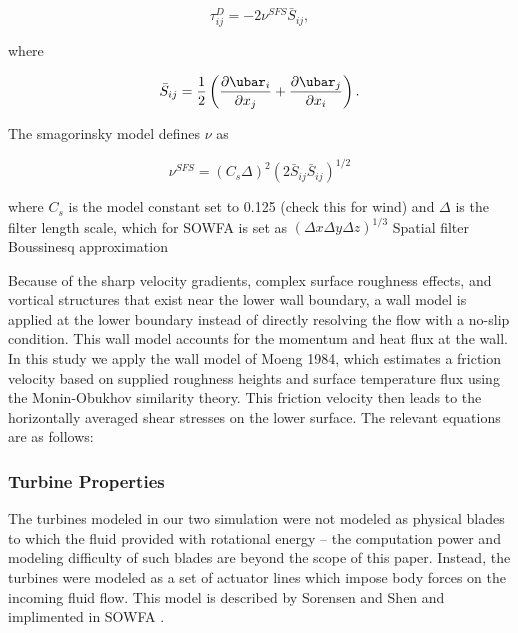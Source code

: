 \begin{equation}
   \label{eq:smagorinsky}
   \tau^D_{ij} = -2 \nu^{SFS} \bar{S}_{ij},
\end{equation}

where

\begin{equation}
   \bar{S}_{ij} = \frac{1}{2} \left( \frac{\partial \ubar_i}{\partial x_j} + \frac{\partial \ubar_j}{\partial x_i} \right).
\end{equation}

The smagorinsky model defines $\nu$ as

\begin{equation}
   \nu^{SFS} = (C_s \Delta)^2(2\bar{S}_{ij}\bar{S}_{ij})^{1/2}
\end{equation}

where $C_s$ is the model constant set to 0.125 (check this for wind) and $\Delta$ is the filter length scale, which for SOWFA is set as $(\Delta x \Delta y \Delta z)^{1/3}$
Spatial filter
Boussinesq approximation

Because of the sharp velocity gradients, complex surface roughness effects, and vortical structures that exist near the lower wall boundary, a wall model is applied at the lower boundary instead of directly resolving the flow with a no-slip condition.  This wall model accounts for the momentum and heat flux at the wall.  In this study we apply the wall model of Moeng 1984, which estimates a friction velocity based on supplied roughness heights and surface temperature flux using the Monin-Obukhov similarity theory.  This friction velocity then leads to the horizontally averaged shear stresses on the lower surface.  The relevant equations are as follows:




\subsubsection{Turbine Properties}

The turbines modeled in our two simulation were not modeled as physical blades to which the fluid provided with rotational energy -- the computation power and modeling difficulty of such blades are beyond the scope of this paper. Instead, the turbines were modeled as a set of actuator lines which impose body forces on the incoming fluid flow. This model is described by Sorensen and Shen \cite{sorensen:393} and implimented in SOWFA \cite{SOWFA}.


